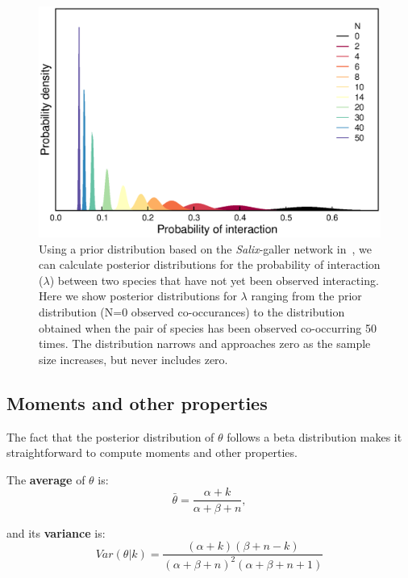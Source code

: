 ﻿\documentclass[12pt]{article}
\begin{document}
      \begin{figure}[ht]
        \label{Salix_pdfs}
        \caption{Using a prior distribution based on the \emph{Salix}-galler network in~\citet{Barbour2016}, we can calculate posterior distributions for the probability of interaction ($\lambda$) between two species that have not yet been observed interacting. Here we show posterior distributions for $\lambda$ ranging from the prior distribution (N=0 observed co-occurances) to the distribution obtained when the pair of species has been observed co-occurring 50 times. The distribution narrows and approaches zero as the sample size increases, but never includes zero.}
        \includegraphics*[width=.8\textwidth]{figures/Salix_Galler_pdfs_increasing_N.eps}
        \end{figure}


    \subsection*{Moments and other properties}

      The fact that the posterior distribution of $\theta$ follows a beta distribution makes it straightforward to compute moments and other properties. 

      The \textbf{average} of $\theta$ is: 
          \begin{equation}
            \bar{\theta} = \frac{\alpha+k}{\alpha+\beta+n} ,
            \label{mean}
          \end{equation}

        and its \textbf{variance} is:  
          \begin{equation}
            Var(\theta|k) = \frac{(\alpha + k)(\beta + n - k)}{(\alpha + \beta + n)^{2}(\alpha + \beta + n +1)}
            \label{variance}
          \end{equation}
\end{document}
